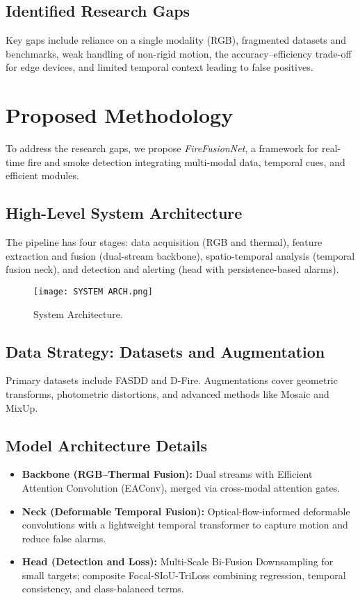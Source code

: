 \documentclass[12pt,a4paper]{article}
\begin{document}
\subsection{Identified Research Gaps}
Key gaps include reliance on a single modality (RGB), fragmented datasets and benchmarks, weak handling of non-rigid motion, the accuracy--efficiency trade-off for edge devices, and limited temporal context leading to false positives.

\section{Proposed Methodology}
To address the research gaps, we propose \emph{FireFusionNet}, a framework for real-time fire and smoke detection integrating multi-modal data, temporal cues, and efficient modules.

\subsection{High-Level System Architecture}
The pipeline has four stages: data acquisition (RGB and thermal), feature extraction and fusion (dual-stream backbone), spatio-temporal analysis (temporal fusion neck), and detection and alerting (head with persistence-based alarms).

\begin{figure}[h]
  \centering
  \texttt{[image: SYSTEM ARCH.png]}
  \caption{System Architecture.}
\end{figure}

\subsection{Data Strategy: Datasets and Augmentation}
Primary datasets include FASDD and D-Fire. Augmentations cover geometric transforms, photometric distortions, and advanced methods like Mosaic and MixUp.

\subsection{Model Architecture Details}
\begin{itemize}
  \item \textbf{Backbone (RGB--Thermal Fusion):} Dual streams with Efficient Attention Convolution (EAConv), merged via cross-modal attention gates.
  \item \textbf{Neck (Deformable Temporal Fusion):} Optical-flow-informed deformable convolutions with a lightweight temporal transformer to capture motion and reduce false alarms.
  \item \textbf{Head (Detection and Loss):} Multi-Scale Bi-Fusion Downsampling for small targets; composite Focal-SIoU-TriLoss combining regression, temporal consistency, and class-balanced terms.
\end{itemize}
\end{document}
